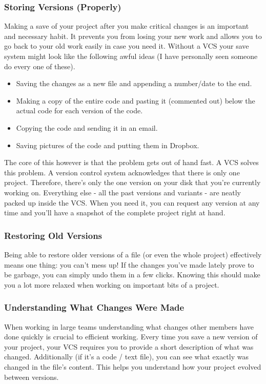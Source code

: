 \documentclass{article}
\begin{document}
    \subsubsection{Storing Versions (Properly)}
    Making a save of your project after you make critical changes is an important and necessary habit. It prevents you from losing your new work and allows you to go back to your old work easily in case you need it. Without a VCS your save system might look like the following awful ideas (I have personally seen someone do every one of these).
    \begin{itemize}
        \item Saving the changes as a new file and appending a number/date to the end.
        \item Making a copy of the entire code and pasting it (commented out) below the actual code for each version of the code. 
        \item Copying the code and sending it in an email.
        \item Saving pictures of the code and putting them in Dropbox.
    \end{itemize}
    The core of this however is that the problem gets out of hand fast. 
    \newline\newline
    A VCS solves this problem. A version control system acknowledges that there is only one project. Therefore, there's only the one version on your disk that you're currently working on. Everything else - all the past versions and variants - are neatly packed up inside the VCS. When you need it, you can request any version at any time and you'll have a snapshot of the complete project right at hand.
    \subsubsection{Restoring Old Versions}
    Being able to restore older versions of a file (or even the whole project) effectively means one thing: you can't mess up! If the changes you've made lately prove to be garbage, you can simply undo them in a few clicks. Knowing this should make you a lot more relaxed when working on important bits of a project.
    
    \subsubsection{Understanding What Changes Were Made}
    When working in large teams understanding what changes other members have done quickly is crucial to efficient working. 
    \newline\newline
    Every time you save a new version of your project, your VCS requires you to provide a short description of what was changed. Additionally (if it's a code / text file), you can see what exactly was changed in the file's content. This helps you understand how your project evolved between versions.
    
\end{document}
